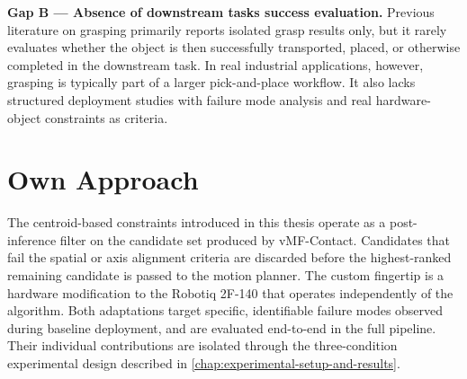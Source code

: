 \documentclass[oneside,studentpaper]{wbk}
\begin{document}

\textbf{Gap B --- Absence of downstream tasks success evaluation.} Previous literature on grasping primarily reports isolated grasp results only, but it rarely evaluates whether the object is then successfully transported, placed, or otherwise completed in the downstream task. In real industrial applications, however, grasping is typically part of a larger pick-and-place workflow. It also lacks structured deployment studies with failure mode analysis and real hardware-object constraints as criteria.



\chapter{Own Approach}
\label{chap:system-design}

The centroid-based constraints introduced in this thesis operate as a post-inference filter on the candidate set produced by vMF-Contact. Candidates that fail the spatial or axis alignment criteria are discarded before the highest-ranked remaining candidate is passed to the motion planner. The custom fingertip is a hardware modification to the Robotiq 2F-140 that operates independently of the algorithm. Both adaptations target specific, identifiable failure modes observed during baseline deployment, and are evaluated end-to-end in the full pipeline. Their individual contributions are isolated through the three-condition experimental design described in \cref{chap:experimental-setup-and-results}.

\end{document}
